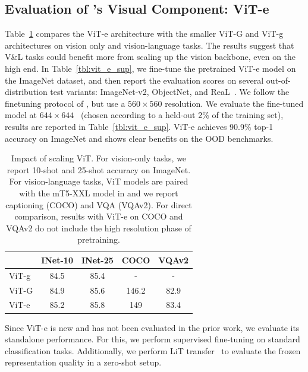 \subsection{Evaluation of \NAME's Visual Component: ViT-e}
\label{lit_results}

Table~\ref{tbl:scaling_vit} compares the ViT-e architecture with the smaller ViT-G and ViT-g architectures on vision only and vision-language tasks.
The results suggest that V\&L tasks could benefit more from scaling up the vision backbone, even on the high end.
In Table~\ref{tbl:vit_e_sup}, we fine-tune the pretrained ViT-e model on the ImageNet dataset, and then report the evaluation scores on several out-of-distribution test variants: ImageNet-v2, ObjectNet, and ReaL~\citep{imagenet_real}.
We follow the finetuning protocol of \citet{zhai-21-scalingvit}, but use a $560\times560$ resolution.
We evaluate the fine-tuned model at $644\times644$~\citep{fixres} (chosen according to a held-out 2\% of the training set), results are reported in Table~\ref{tbl:vit_e_sup}.
ViT-e achieves 90.9\% top-1 accuracy on ImageNet and shows clear benefits on the OOD benchmarks.

\begin{table}[ht!]
\centering
  \begin{tabular}{lcccc}
    \toprule
     &  INet-10 & INet-25 & COCO & VQAv2 \\
    \midrule
    ViT-g  & 84.5 & 85.4 & - & - \\
    ViT-G  & 84.9 & 85.6 & 146.2 & 82.9 \\
    ViT-e  & 85.2  & 85.8 & 149 & 83.4 \\
    \bottomrule
  \end{tabular}
  \caption{Impact of scaling ViT. For vision-only tasks, we report 10-shot and 25-shot accuracy on ImageNet. For vision-language tasks, ViT models are paired with the mT5-XXL model in \NAME and we report captioning (COCO) and VQA (VQAv2).
  For direct comparison, results with ViT-e on COCO and VQAv2 do not include the  high resolution phase of pretraining.}\label{tbl:scaling_vit}
  \vspace{-0.5em}
\end{table}
Since ViT-e is new and has not been evaluated in the prior work, we evaluate its standalone performance.
For this, we perform supervised fine-tuning on standard classification tasks. 
Additionally, we perform LiT transfer~\citep{lit} to evaluate the frozen representation quality in a zero-shot setup.

